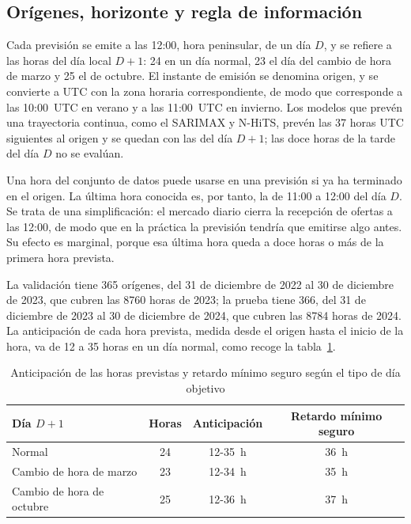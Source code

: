 \subsection{Orígenes, horizonte y regla de información}\label{sec:prot-origenes}

Cada previsión se emite a las 12:00, hora peninsular, de un día $D$, y se
refiere a las horas del día local $D+1$: 24 en un día normal, 23 el día del
cambio de hora de marzo y 25 el de octubre. El instante de emisión se
denomina origen, y se convierte a UTC con la zona horaria correspondiente, de
modo que corresponde a las 10:00~UTC en verano y a las 11:00~UTC en invierno.
Los modelos que prevén una trayectoria continua, como el SARIMAX y N-HiTS,
prevén las 37 horas UTC siguientes al origen y se quedan con las del día
$D+1$; las doce horas de la tarde del día $D$ no se evalúan.

Una hora del conjunto de datos puede usarse en una previsión si ya ha
terminado en el origen. La última hora conocida es, por tanto, la de 11:00 a
12:00 del día $D$. Se trata de una simplificación: el mercado diario cierra la
recepción de ofertas a las 12:00, de modo que en la práctica la previsión
tendría que emitirse algo antes. Su efecto es marginal, porque esa última
hora queda a doce horas o más de la primera hora prevista.

La validación tiene 365 orígenes, del 31 de diciembre de 2022 al 30 de
diciembre de 2023, que cubren las 8760 horas de 2023; la prueba tiene 366, del
31 de diciembre de 2023 al 30 de diciembre de 2024, que cubren las 8784 horas
de 2024. La anticipación de cada hora prevista, medida desde el origen hasta
el inicio de la hora, va de 12 a 35 horas en un día normal, como recoge la
tabla~\ref{tab:anticipacion}.

\begin{table}[htbp]
	\centering
	\caption{Anticipación de las horas previstas y retardo mínimo seguro según el tipo de día objetivo}
	\label{tab:anticipacion}
	\small
	\begin{tabular}{lccc}
		\hline
		\textbf{Día $D+1$} & \textbf{Horas} & \textbf{Anticipación} & \textbf{Retardo mínimo seguro} \\
		\hline
		Normal & 24 & 12-35~h & 36~h \\
		Cambio de hora de marzo & 23 & 12-34~h & 35~h \\
		Cambio de hora de octubre & 25 & 12-36~h & 37~h \\
		\hline
	\end{tabular}
\end{table}


